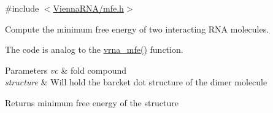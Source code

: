 {\ttfamily \#include $<$\hyperlink{mfe_8h}{Vienna\-R\-N\-A/mfe.\-h}$>$}



Compute the minimum free energy of two interacting R\-N\-A molecules. 

The code is analog to the \hyperlink{group__mfe__fold_gabd3b147371ccf25c577f88bbbaf159fd}{vrna\-\_\-mfe()} function.


\begin{DoxyParams}{Parameters}
{\em vc} & fold compound \\
\hline
{\em structure} & Will hold the barcket dot structure of the dimer molecule \\
\hline
\end{DoxyParams}
\begin{DoxyReturn}{Returns}
minimum free energy of the structure 
\end{DoxyReturn}
